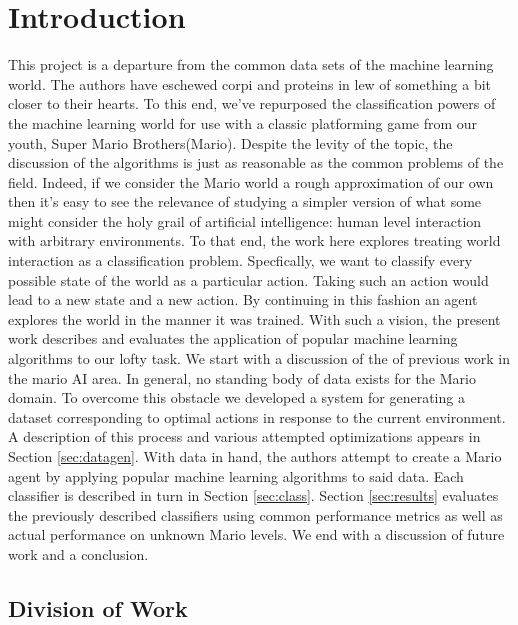 \documentclass[]{article}   %
\begin{document}
\section{Introduction}     %
This project is a departure from the common data sets of the machine learning world. The authors have eschewed corpi and proteins in lew of something a bit closer to their hearts.  To this end, we've repurposed the classification powers of the machine learning world for use with a classic platforming game from our youth, Super Mario Brothers(Mario).  Despite the levity of the topic, the discussion of the algorithms is just as reasonable as the common problems of the field.  Indeed, if we consider the Mario world a rough approximation of our own then it's easy to see the relevance of studying a simpler version of what some might consider the holy grail of artificial intelligence: human level interaction with arbitrary environments.
\newline\newline
To that end, the work here explores treating world interaction as a classification problem.  Specfically, we want to classify every possible state of the world as a particular action. Taking such an action would lead to a new state and a new action.  By continuing in this fashion an agent explores the world in the manner it was trained.
\newline\newline
With such a vision, the present work describes and evaluates the application of popular machine learning algorithms to our lofty task.  We start with a discussion of the of previous work in the mario AI area.  In general, no standing body of data exists for the Mario domain.  To overcome this obstacle we developed a system for generating a dataset corresponding to optimal actions in response to the current environment.  A description of this process and various attempted optimizations appears in Section \ref{sec:datagen}.  With data in hand, the authors attempt to create a Mario agent by applying popular machine learning algorithms to said data.  Each classifier is described in turn in Section \ref{sec:class}.  Section \ref{sec:results} evaluates the previously described classifiers using common performance metrics as well as actual performance on unknown Mario levels.  We end with a discussion of future work and a conclusion.

\subsection{Division of Work}
\end{document}
